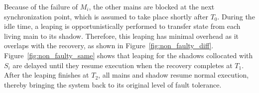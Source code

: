 Because of the failure of $M_i$, the other mains are blocked at the next synchronization point, which is assumed to take place shortly after $T_0$. During the idle time, a leaping is opportunistically performed to transfer state from each living main to its shadow. Therefore, this leaping has minimal overhead as it overlaps with the recovery, as shown in Figure~\ref{fig:non_faulty_diff}. Figure~\ref{fig:non_faulty_same} shows that leaping for the shadows collocated with $S_i$ are delayed until they resume execution when the recovery completes at $T_1$. After the leaping finishes at $T_2$, all mains and shadow resume normal execution, thereby bringing the system back to its original level of fault tolerance.


